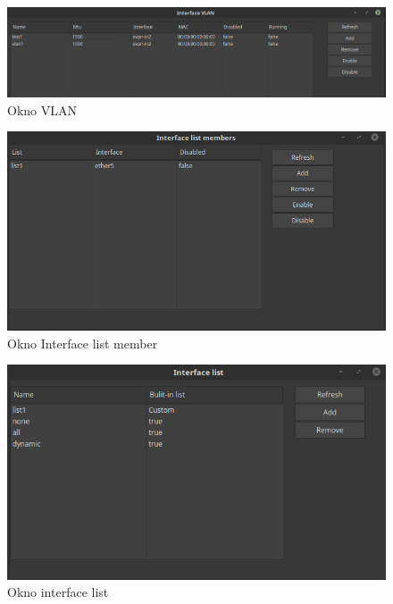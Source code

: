 \begin{figure}[H]
\centering
\includegraphics[scale=0.35]{../text/vlangui.png}
\caption{Okno VLAN}
\label{fig:vlangui}
\end{figure}
\begin{figure}[H]
\centering
\includegraphics[scale=0.35]{../text/ifacelistmember.png}
\caption{Okno Interface list member}
\label{fig:interfacelistmembergui}
\end{figure}
\begin{figure}[H]
\centering
\includegraphics[scale=0.45]{../text/ifacelist.png}
\caption{Okno interface list}
\label{fig:interfacelistgui}
\end{figure}
